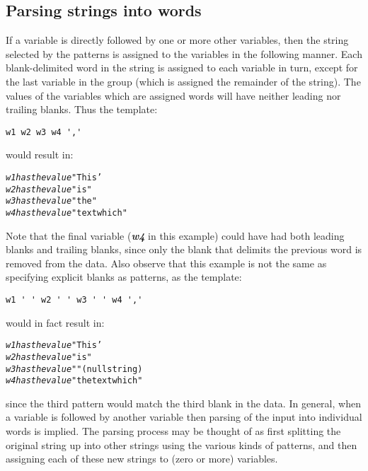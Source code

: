\subsection{Parsing strings into words}
 If a variable is directly followed by one or more other variables,
then the string selected by the patterns is assigned to the variables
in the following manner.
Each blank-delimited word in the string is
assigned to each variable in turn, except for the last variable in the
group (which is assigned the remainder of the string).
The values of the variables which are assigned words will have neither
leading nor trailing blanks.
 Thus the template:
\begin{lstlisting}
w1 w2 w3 w4 ','
\end{lstlisting}
would result in:
\begin{alltt}
\emph{w1} \emph{has the value} "This'
\emph{w2} \emph{has the value} "is"
\emph{w3} \emph{has the value} "the"
\emph{w4} \emph{has the value} "text which"
\end{alltt}
Note that the final variable (\textbf{\emph{w4}} in this
example) could have had both leading blanks and trailing blanks, since
only the blank that delimits the previous word is removed from the data.
 Also observe that this example is not the same as specifying
explicit blanks as patterns, as the template:
\begin{lstlisting}
w1 ' ' w2 ' ' w3 ' ' w4 ','
\end{lstlisting}
would in fact result in:
\begin{alltt}
\emph{w1} \emph{has the value} "This'
\emph{w2} \emph{has the value} "is"
\emph{w3} \emph{has the value} ""  (null string)
\emph{w4} \emph{has the value} "the text which"
\end{alltt}
since the third pattern would match the third blank in the data.
 In general, when a variable is followed by another variable then
parsing of the input into individual words is implied.
The parsing process may be thought of as first splitting the original
string up into other strings using the various kinds of patterns, and
then assigning each of these new strings to (zero or more) variables.
